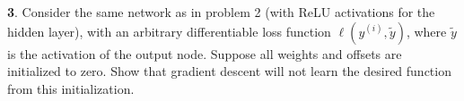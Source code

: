 \textbf{3}. Consider the same network as in problem 2 (with ReLU activations for the hidden layer), with an arbitrary differentiable loss function $\ell(y^{(i)},\tilde{y})$, where $\tilde{y}$ is the activation of the output node. Suppose all weights and offsets are initialized to zero. Show that gradient descent will not learn the desired function from this initialization.
